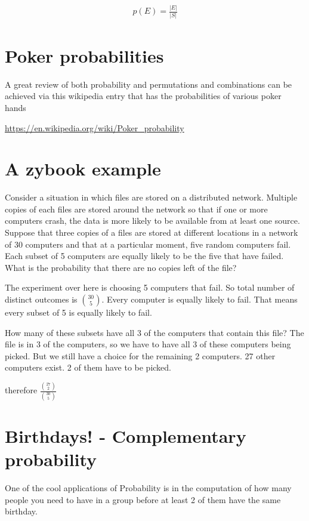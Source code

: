 \documentclass[12pt]{article}
\begin{document}
\begin{align*}
p(E) = \frac{|E|}{|S|}
\end{align*}

\pagebreak

\section*{Poker probabilities}

A great review of both probability and permutations and combinations can be achieved via this wikipedia entry that has the probabilities of various poker hands

\href{https://en.wikipedia.org/wiki/Poker\_probability}{https://en.wikipedia.org/wiki/Poker\_probability}

\section*{A zybook example}
Consider a situation in which files are stored on a distributed network. Multiple copies of each files are stored around the network so that if one or more computers crash, the data is more likely to be available from at least one source. Suppose that three copies of a files are stored at different locations in a network of 30 computers and that at a particular moment, five random computers fail. Each subset of 5 computers are equally likely to be the five that have failed. What is the probability that there are no copies left of the file?

The experiment over here is choosing 5 computers that fail. So total number of distinct outcomes is ${30 \choose 5}$. Every computer is equally likely to fail. That means every subset of 5 is equally likely to fail. 

How many of these subsets have all 3 of the computers that contain this file? The file is in 3 of the computers, so we have to have all 3 of these computers being picked. But we still have a choice for the remaining 2 computers. 27 other computers exist. 2 of them have to be picked.

therefore $\frac{{27 \choose 2}}{{30 \choose 5}}$

\section*{Birthdays! - Complementary probability}

One of the cool applications of Probability is in the computation of how many people you need to have in a group before at least 2 of them have the same birthday.
\end{document}
